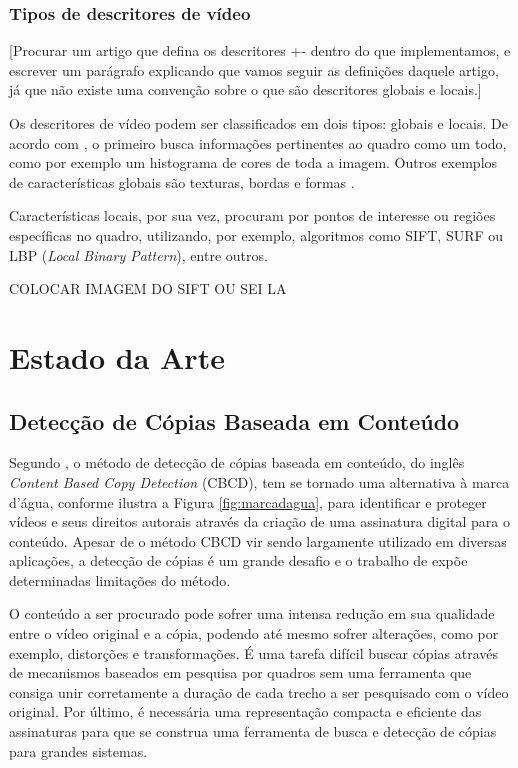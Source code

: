         \subsection{Tipos de descritores de vídeo}
        
        [Procurar um artigo que defina os descritores +- dentro do que implementamos, e escrever um parágrafo explicando que vamos seguir as definições daquele artigo, já que não existe uma convenção sobre o que são descritores globais e locais.]


	Os descritores de vídeo podem ser classificados em dois tipos: globais e locais. De acordo com \cite{de2012combinaccao}, o primeiro busca informações pertinentes ao quadro como um todo, como por exemplo um histograma de cores de toda a imagem. Outros exemplos de características globais são texturas, bordas e formas  \cite{law2007video}.
       
    Características locais, por sua vez, procuram por pontos de interesse ou regiões específicas no quadro, utilizando, por exemplo, algoritmos como SIFT, SURF ou LBP (\textit{Local Binary Pattern}), entre outros.      
    
    COLOCAR IMAGEM DO SIFT OU SEI LA

\chapter{Estado da Arte}
\label{chap:estadodaarte}

     \section{Detecção de Cópias Baseada em Conteúdo} 
	Segundo \cite{jiang2011pku}, o método de detecção de cópias baseada em conteúdo, do inglês \textit{Content Based Copy Detection} (CBCD), tem se tornado uma alternativa à marca d'água, conforme ilustra a Figura \ref{fig:marcadagua}, para identificar e proteger vídeos e seus direitos autorais através da criação de uma assinatura digital para o conteúdo. Apesar de o método CBCD vir sendo largamente utilizado em diversas aplicações, a detecção de cópias é um grande desafio e o trabalho de \cite{jiang2011pku} expõe determinadas limitações do método.
    
    O conteúdo a ser procurado pode sofrer uma intensa redução em sua qualidade entre o vídeo original e a cópia, podendo até mesmo sofrer alterações, como por exemplo, distorções e transformações. É uma tarefa difícil buscar cópias através de mecanismos baseados em pesquisa por quadros sem uma ferramenta que consiga unir corretamente a duração de cada trecho a ser pesquisado com o vídeo original. Por último, é necessária uma representação compacta e eficiente das assinaturas para que se construa uma ferramenta de busca e detecção de cópias para grandes sistemas.
    
